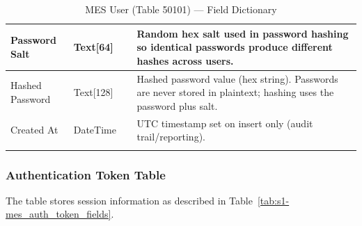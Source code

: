 \begin{longtable}{@{} P{0.18\linewidth} P{0.18\linewidth} P{0.64\linewidth} @{}}
	Password Salt     & Text[64]                      &                      
	Random hex salt used in password hashing so identical passwords produce different hashes across users. \\
	\midrule
	
	Hashed Password   & Text[128]                     &                      
	Hashed password value (hex string). Passwords are never stored in plaintext; hashing uses the password plus salt. \\
	\midrule
	
	Created At        & DateTime                      &                      
	UTC timestamp set on insert only (audit trail/reporting). \\
	\midrule
	\noalign{\vskip 4pt}
	\caption{MES User (Table 50101) --- Field Dictionary}
	\label{tab:s1-mes_user_fields}
	
\end{longtable}

\subsubsection{Authentication Token Table}

The  table stores session information as described
in Table~\ref{tab:s1-mes_auth_token_fields}.

